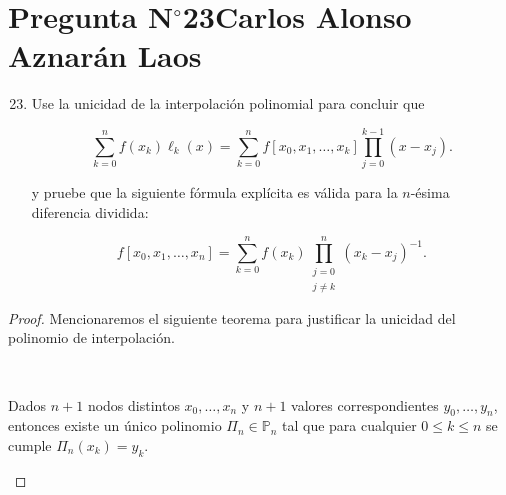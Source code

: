 \section{Pregunta N$^{\circ}$23\qquad Carlos Alonso Aznarán Laos}




\begin{frame}
	\begin{enumerate}\setcounter{enumi}{22}
		\item

		      Use la unicidad de la interpolación polinomial para
		      concluir que


		      \begin{equation*}
			      \sum\limits_{k=0}^{n}
			      f\left(x_{k}\right)
			      \ell_{k}\left(x\right)=
			      \sum\limits_{k=0}^{n}
			      f\left[x_{0},x_{1},\ldots,x_{k}\right]
			      \prod\limits_{j=0}^{k-1}
			      \left(x-x_{j}\right).
		      \end{equation*}

		      y pruebe que la siguiente fórmula explícita es válida para
		      la $n$-ésima diferencia dividida:

		      \begin{equation*}
			      f\left[x_{0},x_{1},\ldots,x_{n}\right]=
			      \sum\limits_{k=0}^{n}
			      f\left(x_{k}\right)
			      \prod\limits_{\substack{j=0\\j\neq k}}^{n}
			      {\left(x_{k}-x_{j}\right)}^{-1}.
		      \end{equation*}
	\end{enumerate}

	\begin{proof}
		Mencionaremos el siguiente teorema para justificar la unicidad
		del polinomio de interpolación.

		\

		\begin{theorem}
			Dados $n+1$ \alert{nodos distintos}
			\begin{math}
				x_{0},\ldots,x_{n}
			\end{math}
			y $n+1$ valores correspondientes
			\begin{math}
				y_{0},\ldots,y_{n}
			\end{math},
			entonces existe un \alert{único polinomio}
			$\Pi_{n}\in\mathbb{P}_{n}$ tal que para cualquier
			$0\leq k\leq n$ se cumple $\Pi_{n}\left(x_{k}\right)=y_{k}$.
		\end{theorem}


\end{proof}
\end{frame}
